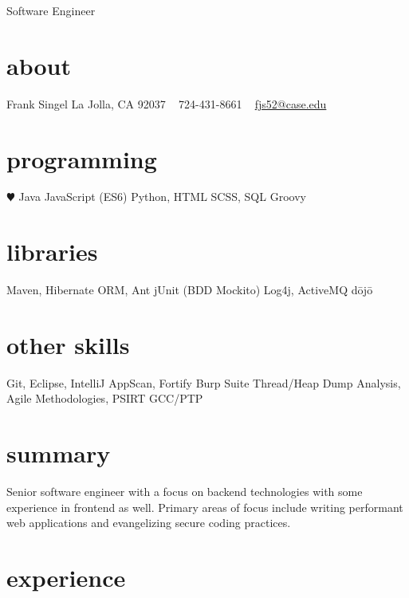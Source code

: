 \documentclass[]{friggeri-cv}
\begin{document}
       {Software Engineer}


\begin{aside}
  \section{about}
    Frank Singel
    La Jolla, CA
    92037
    ~
    724-431-8661
    ~
    \href{mailto:fjs52@case.edu}{fjs52@case.edu}
  \section{programming}
    {\color{red} $\varheartsuit$} Java
    JavaScript (ES6)
    Python, HTML
    SCSS, SQL
    Groovy
  \section{libraries}
    Maven, 
    Hibernate ORM, Ant
    jUnit (BDD Mockito)
    Log4j, ActiveMQ
    d\={o}j\={o}
  \section{other skills}
    Git, Eclipse, IntelliJ
    AppScan, Fortify
    Burp Suite
    Thread/Heap Dump Analysis,
    Agile Methodologies, PSIRT
    GCC/PTP
    
\end{aside}

\section{summary}
Senior software engineer with a focus on backend technologies with some experience in frontend as well. Primary areas of focus include writing performant web applications and evangelizing secure coding practices.

\section{experience}
\end{document}
